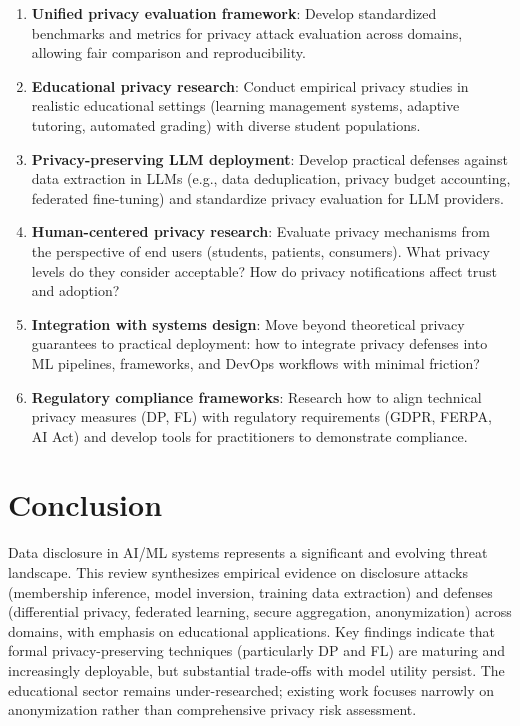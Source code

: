 \documentclass[11pt,a4paper]{article}
\begin{document}
\begin{enumerate}
\item \textbf{Unified privacy evaluation framework}: Develop standardized benchmarks and metrics for privacy attack evaluation across domains, allowing fair comparison and reproducibility.

\item \textbf{Educational privacy research}: Conduct empirical privacy studies in realistic educational settings (learning management systems, adaptive tutoring, automated grading) with diverse student populations.

\item \textbf{Privacy-preserving LLM deployment}: Develop practical defenses against data extraction in LLMs (e.g., data deduplication, privacy budget accounting, federated fine-tuning) and standardize privacy evaluation for LLM providers.

\item \textbf{Human-centered privacy research}: Evaluate privacy mechanisms from the perspective of end users (students, patients, consumers). What privacy levels do they consider acceptable? How do privacy notifications affect trust and adoption?

\item \textbf{Integration with systems design}: Move beyond theoretical privacy guarantees to practical deployment: how to integrate privacy defenses into ML pipelines, frameworks, and DevOps workflows with minimal friction?

\item \textbf{Regulatory compliance frameworks}: Research how to align technical privacy measures (DP, FL) with regulatory requirements (GDPR, FERPA, AI Act) and develop tools for practitioners to demonstrate compliance.
\end{enumerate}

\section{Conclusion}

Data disclosure in AI/ML systems represents a significant and evolving threat landscape. This review synthesizes empirical evidence on disclosure attacks (membership inference, model inversion, training data extraction) and defenses (differential privacy, federated learning, secure aggregation, anonymization) across domains, with emphasis on educational applications. Key findings indicate that formal privacy-preserving techniques (particularly DP and FL) are maturing and increasingly deployable, but substantial trade-offs with model utility persist. The educational sector remains under-researched; existing work focuses narrowly on anonymization rather than comprehensive privacy risk assessment.
\end{document}
